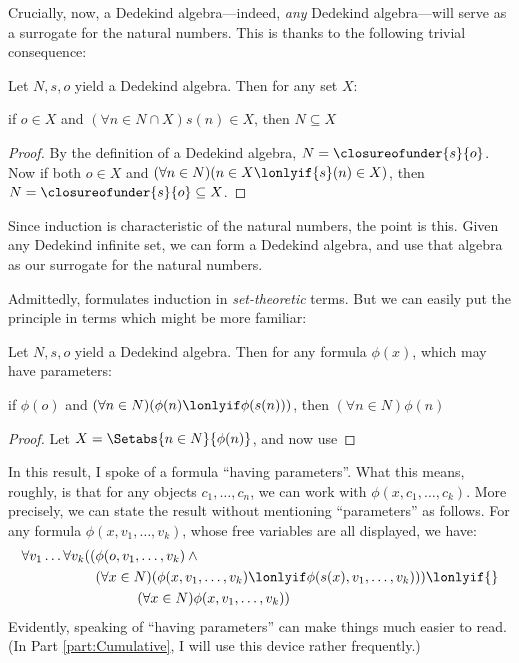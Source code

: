 \documentclass[../../../include/open-logic-section]{subfiles}
\begin{document}
Crucially, now, a Dedekind algebra---indeed, \emph{any} Dedekind algebra---will serve as a surrogate for the natural numbers. This is thanks to the following trivial consequence:
\begin{thm}
	Let $N, s, o$ yield a Dedekind algebra. Then for any set $X$: %
	\begin{center}
		if $o \in X$ and $(\forall {n} \in N \cap X){s}({n}) \in X$, {then} $N \subseteq X$
		\end{center}
\end{thm}
	\begin{proof}
		By the definition of a Dedekind algebra, $N = \closureofunder{s}{o}$. Now if both ${o} \in X$ and $(\forall {n} \in N)(n \in X \lonlyif {s}({n}) \in X)$, then $N = \closureofunder{s}{o} \subseteq X$. 
	\end{proof}\noindent
Since induction is characteristic of the natural numbers, the point is this. Given any Dedekind infinite set, we can form a Dedekind algebra, and use that algebra as our surrogate for the natural numbers. 

Admittedly,  formulates induction in \emph{set-theoretic} terms. But we can easily put the principle in terms which might be more familiar:
\begin{cor}
	Let $N, s, o$ yield a Dedekind algebra. Then for any formula $\phi(x)$, which may have parameters:
\begin{center}
	if $\phi(o)$ and $(\forall {n} \in N)(\phi(n)\lonlyif \phi({s}({n})))$, {then} $(\forall n \in N)\phi(n)$
\end{center}
\end{cor}
\begin{proof}
	Let $X = \Setabs{n \in N}{\phi(n)}$, and now use 
\end{proof}\noindent
In this result, I spoke of a formula ``having parameters''. What this means, roughly, is that for any objects $c_1, \ldots, c_n$, we can work with $\phi(x, c_1, \ldots, c_k)$. More precisely, we can state the result without mentioning ``parameters'' as follows. For any formula $\phi(x, v_1, \ldots, v_k)$, whose free variables are all displayed, we have:
	\begin{align*}
			\forall v_1 \ldots \forall v_k((&\phi(o, v_1,\ldots, v_k) \land {}\\
			&	(\forall x \in N)(\phi(x,v_1, \ldots, v_k) \lonlyif \phi(s(x), v_1,\ldots, v_k))) \lonlyif {}\\
			&\hspace{3em} (\forall x \in N)\phi(x, v_1,\ldots, v_k))
	\end{align*}
Evidently, speaking of ``having parameters'' can make things much easier to read. (In Part \ref{part:Cumulative}, I will use this device rather frequently.)
\end{document}

